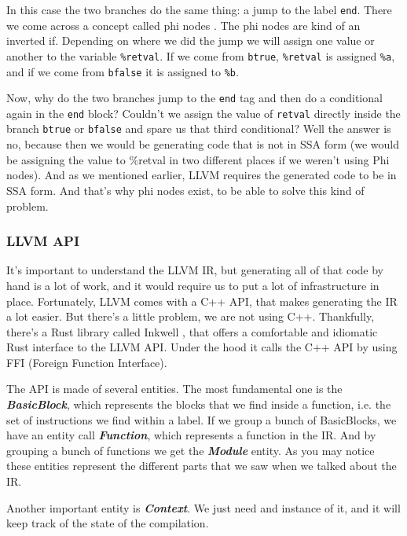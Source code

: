 ﻿\documentclass[10pt,a4paper,twocolumn,twoside]{article}
\begin{document}
In this case the two branches do the same thing: a jump to the label
\texttt{end}. There we come across a concept called phi nodes
\cite{phitutorial}\cite{phiinst}. The phi nodes are kind of an inverted if.
Depending on where we did the jump we will assign one value or another to the
variable \texttt{\%retval}. If we come from \texttt{btrue}, \texttt{\%retval} is
assigned \texttt{\%a}, and if we come from \texttt{bfalse} it is assigned to
\texttt{\%b}.

Now, why do the two branches jump to the \texttt{end} tag and then do a
conditional again in the \texttt{end} block? Couldn't we assign the value of
\texttt{retval} directly inside the branch \texttt{btrue} or \texttt{bfalse} and
spare us that third conditional? Well the answer is no, because then we would be
generating code that is not in SSA form (we would be assigning the value to
\%retval in two different places if we weren't using Phi nodes). And as we
mentioned earlier, LLVM requires the generated code to be in SSA form. And
that's why phi nodes exist, to be able to solve this kind of problem.

\subsubsection{LLVM API}

It's important to understand the LLVM IR, but generating all of that code by
hand is a lot of work, and it would require us to put a lot of infrastructure in
place. Fortunately, LLVM comes with a C++ API, that makes generating the IR a
lot easier. But there's a little problem, we are not using C++. Thankfully,
there's a Rust library called Inkwell \cite{inkwell}, that offers a comfortable
and idiomatic Rust interface to the LLVM API. Under the hood it calls the C++
API by using FFI (Foreign Function Interface).

The API is made of several entities. The most fundamental one is the
\textbf{\textit{BasicBlock}}, which represents the blocks that we find inside a
function, i.e. the set of instructions we find within a label. If we group a
bunch of BasicBlocks, we have an entity call \textbf{\textit{Function}}, which
represents a function in the IR. And by grouping a bunch of functions we get the
\textbf{\textit{Module}} entity. As you may notice these entities represent the
different parts that we saw when we talked about the IR.

Another important entity is \textit{\textbf{Context}}. We just need and instance of it, 
and it will keep track of the state of the compilation.
\end{document}
